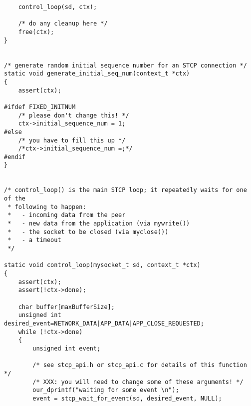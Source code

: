 \documentclass[11pt,a4paper,titlepage]{article}
\begin{document}
\begin{lstlisting}
    control_loop(sd, ctx);

    /* do any cleanup here */
    free(ctx);
}


/* generate random initial sequence number for an STCP connection */
static void generate_initial_seq_num(context_t *ctx)
{
    assert(ctx);

#ifdef FIXED_INITNUM
    /* please don't change this! */
    ctx->initial_sequence_num = 1;
#else
    /* you have to fill this up */
    /*ctx->initial_sequence_num =;*/
#endif
}


/* control_loop() is the main STCP loop; it repeatedly waits for one of the
 * following to happen:
 *   - incoming data from the peer
 *   - new data from the application (via mywrite())
 *   - the socket to be closed (via myclose())
 *   - a timeout
 */

static void control_loop(mysocket_t sd, context_t *ctx)
{
    assert(ctx);
    assert(!ctx->done);

	char buffer[maxBufferSize];
	unsigned int desired_event=NETWORK_DATA|APP_DATA|APP_CLOSE_REQUESTED;
    while (!ctx->done)
    {
        unsigned int event;

        /* see stcp_api.h or stcp_api.c for details of this function */
        /* XXX: you will need to change some of these arguments! */
		our_dprintf("waiting for some event \n");
        event = stcp_wait_for_event(sd, desired_event, NULL);


\end{lstlisting}
\end{document}
